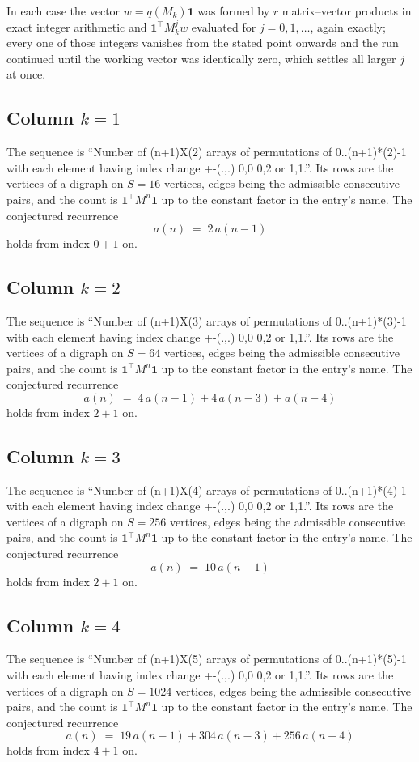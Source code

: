 \documentclass[11pt,a4paper]{article}
\theoremstyle{plain}
\theoremstyle{definition}
\begin{document}
In each case the vector $w=q(M_k)\mathbf{1}$ was formed by $r$ matrix--vector products in
exact integer arithmetic and $\mathbf{1}^{\!\top}M_k^{j}w$ evaluated for $j=0,1,\dots$,
again exactly; every one of those integers vanishes from the stated point onwards and the run
continued until the working vector was identically zero, which settles all larger $j$ at once.

\subsection*{Column $k$$=1$}
The sequence is ``Number of (n+1)X(2) arrays of permutations of 0..(n+1)*(2)-1 with each element having index change +-(.,.) 0,0 0,2 or 1,1.''. Its rows are the vertices of a digraph on
$S=16$ vertices, edges being the admissible consecutive pairs, and the count is
$\mathbf{1}^{\!\top}M^{n}\mathbf{1}$ up to the constant factor in the entry's name.
The conjectured recurrence
\[
a(n)\;=\;2\,a(n-1)
\]
holds from index $0+1$ on.

\subsection*{Column $k$$=2$}
The sequence is ``Number of (n+1)X(3) arrays of permutations of 0..(n+1)*(3)-1 with each element having index change +-(.,.) 0,0 0,2 or 1,1.''. Its rows are the vertices of a digraph on
$S=64$ vertices, edges being the admissible consecutive pairs, and the count is
$\mathbf{1}^{\!\top}M^{n}\mathbf{1}$ up to the constant factor in the entry's name.
The conjectured recurrence
\[
a(n)\;=\;4\,a(n-1) + 4\,a(n-3) + a(n-4)
\]
holds from index $2+1$ on.

\subsection*{Column $k$$=3$}
The sequence is ``Number of (n+1)X(4) arrays of permutations of 0..(n+1)*(4)-1 with each element having index change +-(.,.) 0,0 0,2 or 1,1.''. Its rows are the vertices of a digraph on
$S=256$ vertices, edges being the admissible consecutive pairs, and the count is
$\mathbf{1}^{\!\top}M^{n}\mathbf{1}$ up to the constant factor in the entry's name.
The conjectured recurrence
\[
a(n)\;=\;10\,a(n-1)
\]
holds from index $2+1$ on.

\subsection*{Column $k$$=4$}
The sequence is ``Number of (n+1)X(5) arrays of permutations of 0..(n+1)*(5)-1 with each element having index change +-(.,.) 0,0 0,2 or 1,1.''. Its rows are the vertices of a digraph on
$S=1024$ vertices, edges being the admissible consecutive pairs, and the count is
$\mathbf{1}^{\!\top}M^{n}\mathbf{1}$ up to the constant factor in the entry's name.
The conjectured recurrence
\[
a(n)\;=\;19\,a(n-1) + 304\,a(n-3) + 256\,a(n-4)
\]
holds from index $4+1$ on.
\end{document}
